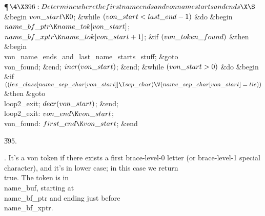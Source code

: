 \Y\P$\4\X396:Determine where the first name ends and von name starts and ends\X%
\S$\6
\&{begin} $\\{von\_start}\K0$;\6
\&{while} $(\\{von\_start}<\\{last\_end}-1)$ \1\&{do}\6
\&{begin} $\\{name\_bf\_ptr}\K\\{name\_tok}[\\{von\_start}]$;\5
$\\{name\_bf\_xptr}\K\\{name\_tok}[\\{von\_start}+1]$;\6
\&{if} $(\\{von\_token\_found})$ \1\&{then}\6
\&{begin} \\{von\_name\_ends\_and\_last\_name\_starts\_stuff};\5
\&{goto} \\{von\_found};\6
\&{end};\2\6
$\\{incr}(\\{von\_start})$;\6
\&{end};\2\6
\&{while} $(\\{von\_start}>0)$ \1\&{do}\6
\&{begin} \&{if} $((\\{lex\_class}[\\{name\_sep\_char}[\\{von\_start}]]\I%
\\{sep\_char})\V(\\{name\_sep\_char}[\\{von\_start}]=\\{tie}))$ \1\&{then}\5
\&{goto} \\{loop2\_exit};\2\6
$\\{decr}(\\{von\_start})$;\6
\&{end};\2\6
\4\\{loop2\_exit}: $\\{von\_end}\K\\{von\_start}$;\6
\4\\{von\_found}: $\\{first\_end}\K\\{von\_start}$;\6
\&{end}\par
\U395.\fi

.
It's a von token if there exists a first brace-level-0 letter (or
brace-level-1 special character), and it's in lower case; in this case
we return \\{true}.  The token is in \\{name\_buf}, starting at
\\{name\_bf\_ptr} and ending just before \\{name\_bf\_xptr}.

